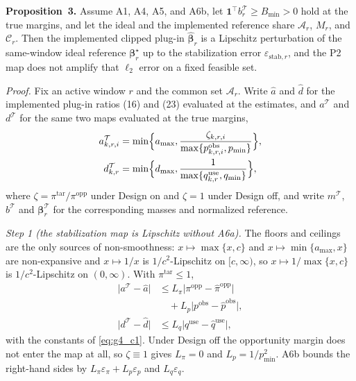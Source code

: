 \noindent\textbf{Proposition~3.}
Assume A1, A4, A5, and A6b, let
$\mathbf{1}^{\top}b_r^{\mathcal T}\ge B_{\min}>0$ hold at the true margins,
and let the ideal and the implemented reference share $\mathcal{A}_r$,
$M_r$, and $\mathcal{C}_r$.  Then the implemented clipped plug-in
$\widehat{\boldsymbol\beta}_r$ is a Lipschitz perturbation of the
same-window ideal reference $\boldsymbol\beta_r^\star$ up to the stabilization
error $\varepsilon_{\mathrm{stab},r}$, and the P2 map does not amplify that
$\ell_2$ error on a fixed feasible set.

\noindent\emph{Proof.}
Fix an active window $r$ and the common set $\mathcal{A}_r$.  Write
$\widehat a$ and $\widehat d$ for the implemented plug-in ratios
(16) and (23) evaluated at the estimates, and
$a^{\mathcal T}$ and $d^{\mathcal T}$ for the same two maps evaluated at the
true margins,
\[
\begin{aligned}
a^{\mathcal T}_{k,r,i}
&=
\min\Bigl\{a_{\max},
\frac{\zeta_{k,r,i}}{\max\{p^{\mathrm{obs}}_{k,r,i},p_{\min}\}}\Bigr\},\\
d^{\mathcal T}_{k,r}
&=
\min\Bigl\{d_{\max},
\frac{1}{\max\{q^{\mathrm{use}}_{k,r},q_{\min}\}}\Bigr\},
\end{aligned}
\]
where $\zeta=\pi^{\mathrm{tar}}/\pi^{\mathrm{opp}}$ under Design on and
$\zeta=1$ under Design off, and write $m^{\mathcal T}$, $b^{\mathcal T}$ and
$\boldsymbol\beta_r^{\mathcal T}$ for the corresponding masses and normalized
reference.

\emph{Step 1 (the stabilization map is Lipschitz without A6a).}  The floors
and ceilings are the only sources of non-smoothness: $x\mapsto\max\{x,c\}$ and
$x\mapsto\min\{a_{\max},x\}$ are non-expansive and $x\mapsto1/x$ is
$1/c^2$-Lipschitz on $[c,\infty)$, so $x\mapsto1/\max\{x,c\}$ is
$1/c^2$-Lipschitz on $(0,\infty)$.  With $\pi^{\mathrm{tar}}\le1$,
\begin{equation}
\begin{aligned}
 \bigl\lvert a^{\mathcal T}-\widehat a\bigr\rvert
 &\le
 L_\pi\bigl\lvert\pi^{\mathrm{opp}}-\widehat\pi^{\mathrm{opp}}\bigr\rvert\\
 &\quad
 +L_p\bigl\lvert p^{\mathrm{obs}}-\widehat p^{\mathrm{obs}}\bigr\rvert,\\
 \bigl\lvert d^{\mathcal T}-\widehat d\bigr\rvert
 &\le
 L_q\bigl\lvert q^{\mathrm{use}}-\widehat q^{\mathrm{use}}\bigr\rvert,
\end{aligned}
 \label{eq:app_plugin_lipschitz}
\end{equation}
with the constants of \eqref{eq:g4_c1}.  Under Design off the opportunity
margin does not enter the map at all, so $\zeta\equiv1$ gives $L_\pi=0$ and
$L_p=1/p_{\min}^2$.  A6b bounds the right-hand sides by
$L_\pi\varepsilon_\pi+L_p\varepsilon_p$ and $L_q\varepsilon_q$.


